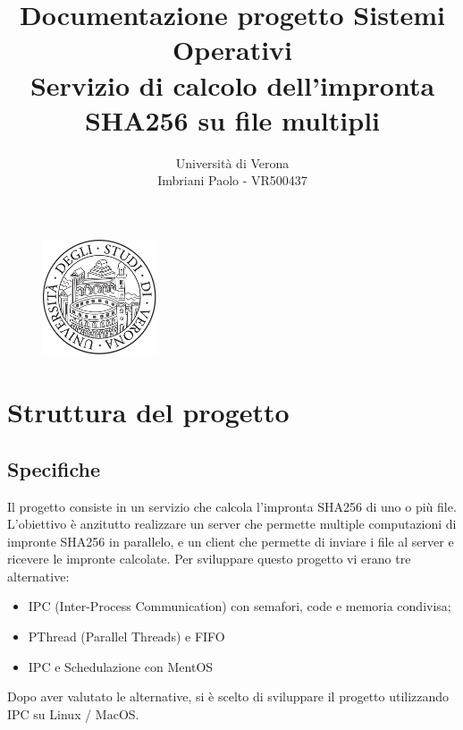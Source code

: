 \documentclass[a4paper]{article}
\begin{document}
\title{Documentazione progetto Sistemi Operativi\\[1ex]
  \large Servizio di calcolo dell'impronta SHA256 su file multipli
}

\author{
  \vspace{0.8cm}
  Università di Verona\\
  Imbriani Paolo - VR500437
}

\begin{figure}
  \centering
  \includegraphics[width=0.3\textwidth]{UniversityofVerona}
\end{figure}

\maketitle 

\pagebreak

\tableofcontents

\pagebreak

\section{Struttura del progetto}

\subsection{Specifiche}

Il progetto consiste in un servizio che calcola l'impronta SHA256 di uno o più file.
L'obiettivo è anzitutto realizzare un server che permette multiple computazioni di impronte
SHA256 in parallelo, e un client che permette di inviare i file al server e ricevere le impronte calcolate.
Per sviluppare questo progetto vi erano tre alternative:
\begin{itemize}
    \item IPC (Inter-Process Communication) con semafori, code e memoria condivisa;
    \item PThread (Parallel Threads) e FIFO
    \item IPC e Schedulazione con MentOS
\end{itemize}
Dopo aver valutato le alternative, si è scelto di sviluppare il progetto
utilizzando IPC su Linux / MacOS. 
\end{document}
